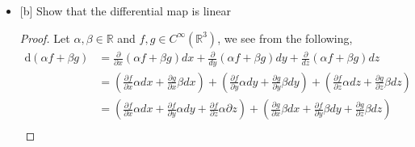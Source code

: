 \documentclass[12pt]{article}
\newcommand      {\Rm}         {{\mathbb R}}
\newcommand {\f}[1]{{#1_1 dx + #1_2 dy + #1_3 dz}}
\begin{document}
\begin{itemize}
\begin{itemize}
\begin{proof}
                Distribution of scalar multiplicatoin with respect to field addition,
                \begin{align*}
                    (\alpha + \beta)f &= (\alpha + \beta)(\f{f}) \\ 
                    &= \f{(\alpha + \beta)f} \\
                    &= (\alpha f_1+ \beta f_1)dx + (\alpha f_2 + \beta f_2)dy + (\alpha f_3 + \beta f_3)dz \\ 
                    &= \f{\alpha f} + \f{\beta f} \\
                    &= \alpha(\f{f}) + \beta(\f{f})\\
                    &= \alpha f + \beta f
                \end{align*}

                We can see our scalar multiplicative identity as, $1 \in \Rm$ and $f\in \Omega^1$,
                \begin{align*}
                    1 f &= 1 (\f{f})\\ &= \f{1f} \\ &= \f{f} = f\\
                    \\
                    f 1 &= (\f{f})1 \\ &= (f_1 1)dx + (f_2 1)dy + (f_3 1)dz \\ &= \f{f} = f
                \end{align*}
                Thus $\Omega^1$ can be regarded as an $\Rm$-vector space.  
        \end{proof}
        \newpage
        \item{[b]} Show that the differential map is linear
        \begin{proof}
            Let $\alpha, \beta \in \Rm$ and $f,g \in C^\infty (\Rm^3)$, we see from the following,
            \begin{align*}
                \text{d}(\alpha f + \beta g) &=  \frac{\partial}{\partial x}(\alpha f + \beta g)dx + \frac{\partial}{dy}(\alpha f + \beta g)dy + \frac{\partial}{dz}(\alpha f + \beta g)dz \\
                &=(\frac{\partial f}{\partial x}\alpha dx + \frac{\partial g}{\partial x}\beta dx) + (\frac{\partial f}{\partial y}\alpha dy + \frac{\partial g}{\partial y}\beta dy) + (\frac{\partial f}{\partial z}\alpha dz + \frac{\partial g}{\partial z}\beta dz) \\
                 &= (\frac{\partial f}{\partial x}\alpha dx + \frac{\partial f}{\partial y}\alpha dy + \frac{\partial f}{\partial z}\alpha \partial z) + (\frac{\partial g}{\partial x}\beta dx + \frac{\partial f}{\partial y}\beta dy + \frac{\partial g}{\partial z}\beta dz) \\

\end{align*}
\end{proof}
\end{itemize}
\end{itemize}
\end{document}
